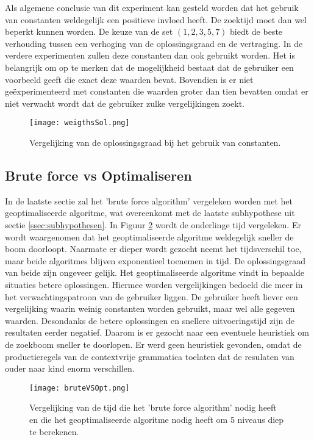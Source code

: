 \documentclass[Main.tex]{subfiles}
\begin{document}
\par Als algemene conclusie van dit experiment kan gesteld worden dat het gebruik van constanten weldegelijk een positieve invloed heeft. De zoektijd moet dan wel beperkt kunnen worden. De keuze van de set $(1, 2, 3, 5, 7)$ biedt de beste verhouding tussen een verhoging van de oplossingsgraad en de vertraging. In de verdere experimenten zullen deze constanten dan ook gebruikt worden. Het is belangrijk om op te merken dat de mogelijkheid bestaat dat de gebruiker een voorbeeld geeft die exact deze waarden bevat. Bovendien is er niet ge\"experimenteerd met constanten die waarden groter dan tien bevatten omdat er niet verwacht wordt dat de gebruiker zulke vergelijkingen zoekt.

\begin{figure}[!htb]
\centering
\texttt{[image: weigthsSol.png]} 
\caption{Vergelijking van de oplossingsgraad bij het gebruik van constanten.} \label{fig:gewichtenOplossingsgraad}
\end{figure}

\subsection{Brute force vs Optimaliseren}
In de laatste sectie zal het 'brute force algorithm' vergeleken worden met het geoptimaliseerde algoritme, wat overeenkomt met de laatste subhypothese uit sectie \ref{ssec:subhypothesen}. In Figuur \ref{fig:brutevsopttijd} wordt de onderlinge tijd vergeleken. Er wordt waargenomen dat het geoptimaliseerde algoritme weldegelijk sneller de boom doorloopt. Naarmate er dieper wordt gezocht neemt het tijdsverschil toe, maar beide algoritmes blijven exponentieel toenemen in tijd. De oplossingsgraad van beide zijn ongeveer gelijk. Het geoptimaliseerde algoritme vindt in bepaalde situaties betere oplossingen. Hiermee worden vergelijkingen bedoeld die meer in het verwachtingspatroon van de gebruiker liggen. De gebruiker heeft liever een vergelijking waarin weinig constanten worden gebruikt, maar wel alle gegeven waarden. Desondanks de betere oplossingen en snellere uitvoeringstijd zijn de resultaten eerder negatief. Daarom is er gezocht naar een eventuele heuristiek om de zoekboom sneller te doorlopen. Er werd geen heuristiek gevonden, omdat de productieregels van de contextvrije grammatica toelaten dat de resulaten van ouder naar kind enorm verschillen.

\begin{figure}[!htb]
\centering
\texttt{[image: bruteVSOpt.png]} 
\caption{Vergelijking van de tijd die het 'brute force algorithm' nodig heeft en die het geoptimaliseerde algoritme nodig heeft om 5 niveaus diep te berekenen.} \label{fig:brutevsopttijd}
\end{figure}
\end{document}
